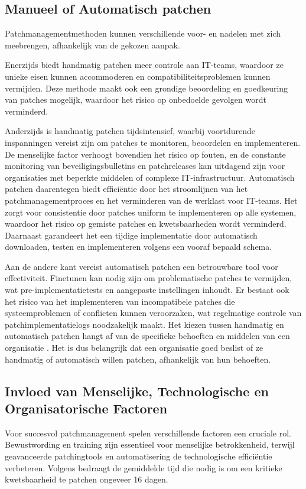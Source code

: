 \subsection{Manueel of Automatisch patchen}
Patchmanagementmethoden kunnen verschillende voor- en nadelen met zich meebrengen, afhankelijk van de gekozen aanpak.

Enerzijds biedt handmatig patchen meer controle aan IT-teams, waardoor ze unieke eisen kunnen accommoderen en compatibiliteitsproblemen kunnen vermijden. Deze methode maakt ook een grondige beoordeling en goedkeuring van patches mogelijk, waardoor het risico op onbedoelde gevolgen wordt verminderd.

Anderzijds is handmatig patchen tijdsintensief, waarbij voortdurende inspanningen vereist zijn om patches te monitoren, beoordelen en implementeren. De menselijke factor verhoogt bovendien het risico op fouten, en de constante monitoring van beveiligingsbulletins en patchreleases kan uitdagend zijn voor organisaties met beperkte middelen of complexe IT-infrastructuur. Automatisch patchen daarentegen biedt efficiëntie door het stroomlijnen van het patchmanagementproces en het verminderen van de werklast voor IT-teams. Het zorgt voor consistentie door patches uniform te implementeren op alle systemen, waardoor het risico op gemiste patches en kwetsbaarheden wordt verminderd. Daarnaast garandeert het een tijdige implementatie door automatisch downloaden, testen en implementeren volgens een vooraf bepaald schema.

Aan de andere kant vereist automatisch patchen een betrouwbare tool voor effectiviteit. Finetunen kan nodig zijn om problematische patches te vermijden, wat pre-implementatietests en aangepaste instellingen inhoudt. Er bestaat ook het risico van het implementeren van incompatibele patches die systeemproblemen of conflicten kunnen veroorzaken, wat regelmatige controle van patchimplementatielogs noodzakelijk maakt. Het kiezen tussen handmatig en automatisch patchen hangt af van de specifieke behoeften en middelen van een organisatie \autocite{Firch2023}. Het is dus belangrijk dat een organisatie goed beslist of ze handmatig of automatisch willen patchen, afhankelijk van hun behoeften.

\subsection{ Invloed van Menselijke, Technologische en Organisatorische Factoren}
Voor succesvol patchmanagement spelen verschillende factoren een cruciale rol. Bewustwording en training zijn essentieel voor menselijke betrokkenheid, terwijl geavanceerde patchingtools en automatisering de technologische efficiëntie verbeteren. Volgens \autocite{ServiceNow2020} bedraagt de gemiddelde tijd die nodig is om een kritieke kwetsbaarheid te patchen ongeveer 16 dagen.

